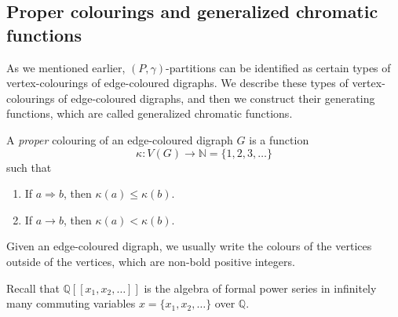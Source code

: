 \documentclass[11pt]{amsart}
\numberwithin{equation}{section}
\newcommand{\bbQ}{{\mathbb{Q}}}
\begin{document}
 
 \subsection{Proper colourings and generalized chromatic functions}\label{subsec:gcf}
 
 As we mentioned earlier, $(P,\gamma)$-partitions can be identified as certain types of vertex-colourings of edge-coloured digraphs. We describe these types of vertex-colourings of edge-coloured digraphs, and then we construct their generating functions, which are called generalized chromatic functions. 

A \emph{proper} colouring of an edge-coloured digraph $G$ is a function $$\kappa:V(G)\rightarrow \mathbb{N}=\{1,2,3,\dots\}$$ such that 
\begin{enumerate}
\item If $a\Rightarrow b$, then $\kappa(a)\leq \kappa(b)$.
\item If $a\rightarrow b$, then $\kappa(a)< \kappa(b)$.
\end{enumerate} 



Given an edge-coloured digraph, we usually write the colours of the vertices outside of the vertices, which are non-bold positive integers. 
\begin{center} 
			 \label{Fig:proper-colouring-edge-coloured}
\end{center} 



Recall that $\bbQ[[x_1,x_2,\dots]]$ is the algebra of formal power series in infinitely many commuting variables $x=\{x_1,x_2,\dots\}$ over $\bbQ$.
\end{document}
